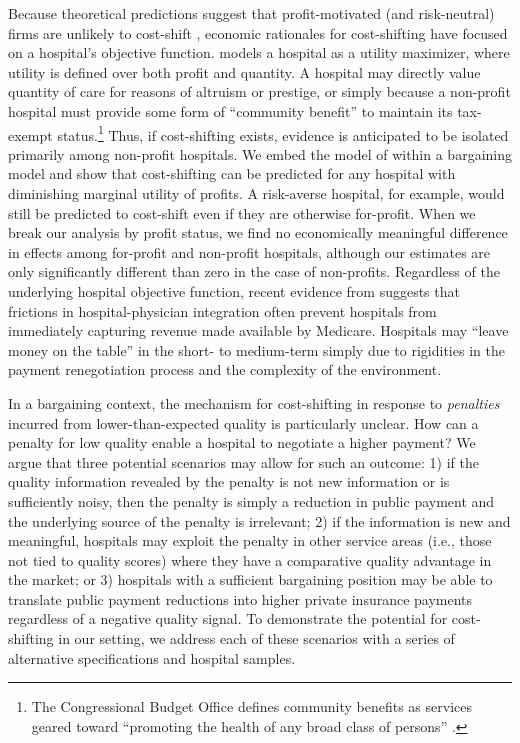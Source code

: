 \documentclass[12pt]{article}
\begin{document}
Because theoretical predictions suggest that profit-motivated (and risk-neutral) firms are unlikely to cost-shift \citep{hay1983}, economic rationales for cost-shifting have focused on a hospital's objective function.  \cite{dranove1988} models a hospital as a utility maximizer, where utility is defined over both profit and quantity.  A hospital may directly value quantity of care for reasons of altruism or prestige, or simply because a non-profit hospital must provide some form of ``community benefit'' to maintain its tax-exempt status.\footnote{The Congressional Budget Office defines community benefits as services geared toward ``promoting the health of any broad class of persons'' \citep{cbo2006}.}  Thus, if cost-shifting exists, evidence is anticipated to be isolated primarily among non-profit hospitals. We embed the model of \cite{dranove1988} within a bargaining model \citep{ho2017} and show that cost-shifting can be predicted for any hospital with diminishing marginal utility of profits. A risk-averse hospital, for example, would still be predicted to cost-shift even if they are otherwise for-profit. When we break our analysis by profit status, we find no economically meaningful difference in effects among for-profit and non-profit hospitals, although our estimates are only significantly different than zero in the case of non-profits.  Regardless of the underlying hospital objective function, recent evidence from \citet{sacarny2018} suggests that frictions in hospital-physician integration often prevent hospitals from immediately capturing revenue made available by Medicare.  Hospitals may ``leave money on the table'' in the short- to medium-term simply due to rigidities in the payment renegotiation process and the complexity of the environment.

In a bargaining context, the mechanism for cost-shifting in response to \textit{penalties} incurred from lower-than-expected quality is particularly unclear. How can a penalty for low quality enable a hospital to negotiate a higher payment? We argue that three potential scenarios may allow for such an outcome: 1) if the quality information revealed by the penalty is not new information or is sufficiently noisy, then the penalty is simply a reduction in public payment and the underlying source of the penalty is irrelevant; 2) if the information is new and meaningful, hospitals may exploit the penalty in other service areas (i.e., those not tied to quality scores) where they have a comparative quality advantage in the market; or 3) hospitals with a sufficient bargaining position may be able to translate public payment reductions into higher private insurance payments regardless of a negative quality signal. To demonstrate the potential for cost-shifting in our setting, we address each of these scenarios with a series of alternative specifications and hospital samples.
\end{document}
